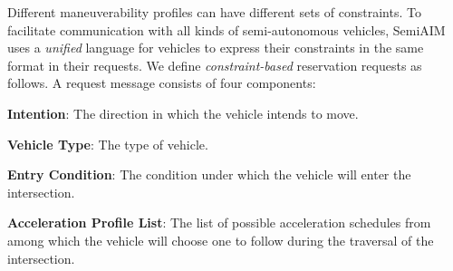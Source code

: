 % 

Different maneuverability profiles can have different sets of
constraints.  To facilitate communication with all kinds of
semi-autonomous vehicles, SemiAIM uses a \emph{unified}
language for vehicles to express their constraints in the same format
in their requests.  We define \emph{constraint-based} reservation
requests as follows.  A request message consists of four components:
\begin{compactenum}
\item{\bf Intention}: The direction in which the vehicle intends to
  move.
\item{\bf Vehicle Type}: The type of vehicle.
\item{\bf Entry Condition}: The condition under which the vehicle
  will enter the intersection.
\item{\bf Acceleration Profile List}: The list of possible acceleration schedules
  from among which the vehicle will choose one to follow
  during the traversal of the intersection.
\end{compactenum}
% 
